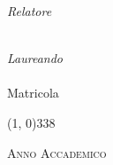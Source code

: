 \begin{titlepage}
\begin{center}
        \vspace{46pt}
        
        \begin{large}
            \begin{flushleft}
                \textit{Relatore}\\
                \vspace{3pt}
                \profTitle\ \myProf
            \end{flushleft}

            \vspace{-37pt}
            
            \begin{flushright}
                \textit{Laureando}\\
                \vspace{3pt}
                \myName\\
                \vspace{3pt}
                Matricola \myStudentID
            \end{flushright}
        \end{large}

        \vspace*{\fill}
        
        \line(1, 0){338} \\
        \begin{normalsize}
            \textsc{Anno Accademico \myAA}
        \end{normalsize}
    \end{center}
\end{titlepage}
